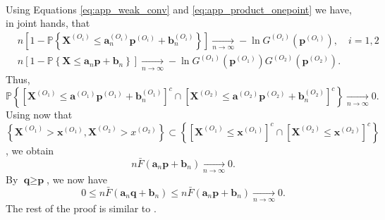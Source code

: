 \documentclass[11pt]{article}
\makeatletter
\renewenvironment{proof}[1][\proofname]{\par
\pushQED{\qed}%
\normalfont \topsep6\p@\@plus6\p@\relax
\trivlist
\item\relax
{\textbf{
#1\@addpunct{ }}}\hspace\labelsep\ignorespaces
}{%
\popQED\endtrivlist\@endpefalse
}
\makeatother
\begin{document}
\begin{proof}
\begin{align*}
		\end{align*}
		Using Equations \eqref{eq:app_weak_conv} and \eqref{eq:app_product_onepoint} we have, in joint hands, that
		\begin{align*}
		&n \left[ 1 - \mathbb{P}\left\{ \textbf{X}^{(O_i)} \leq \textbf{a}_n^{(O_i)} \textbf{p}^{(O_i)} + \textbf{b}_n^{(O_i)} \right\} \right] \underset{n \rightarrow \infty}{\longrightarrow} - \ln G^{(O_i)} (\textbf{p}^{(O_i)}), \quad i =1,2 \\
		&n \left[ 1 - \mathbb{P}\left\{ \textbf{X} \leq \textbf{a}_n \textbf{p} + \textbf{b}_n \right\} \right] \underset{n \rightarrow \infty}{\longrightarrow} - \ln G^{(O_1)} (\textbf{p}^{(O_1)})G^{(O_2)} (\textbf{p}^{(O_2)}).
		\end{align*}
		Thus,
		\begin{equation*}
			\mathbb{P} \left\{ \left[\textbf{X}^{(O_1)} \leq \textbf{a}^{(O_1)} \textbf{p}^{(O_1)} + \textbf{b}_n^{(O_1)} \right]^c \cap \left[\textbf{X}^{(O_2)} \leq \textbf{a}^{(O_2)} \textbf{p}^{(O_2)} + \textbf{b}_n^{(O_2)} \right]^c \right\} \underset{n \rightarrow \infty}{\longrightarrow} 0.
		\end{equation*}
		Using now that $\left\{ \textbf{X}^{(O_1)} > \textbf{x}^{(O_1)}, \textbf{X}^{(O_2)} > x^{(O_2)} \right\} \subset \left\{ [\textbf{X}^{(O_1)} \leq \textbf{x}^{(O_1)}]^c \cap [\textbf{X}^{(O_2)} \leq \textbf{x}^{(O_2)}]^c \right\}$, we obtain
		\begin{equation*}
			 n \bar{F}(\textbf{a}_n \textbf{p} + \textbf{b}_n) \underset{n \rightarrow \infty}{\longrightarrow} 0.
		\end{equation*}
		By $\textbf{q} \geq \textbf{p}$, we now have
		\begin{equation*}
			0 \leq n \bar{F}(\textbf{a}_n \textbf{q} + \textbf{b}_n) \leq n \bar{F}(\textbf{a}_n \textbf{p} + \textbf{b}_n) \underset{n \rightarrow \infty}{\longrightarrow} 0.
		\end{equation*}
		The rest of the proof is similar to \cite{takahashi1994asymptotic}.
	\end{proof}
	
\end{document}
